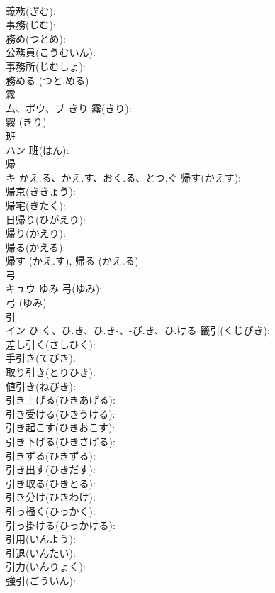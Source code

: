\documentclass[8pt]{extreport}
\begin{document}
\begin{CJK}{UTF8}{min}
\\	義務(ぎむ): 
\\	事務(じむ): 
\\	務め(つとめ): 
\\	公務員(こうむいん): 
\\	事務所(じむしょ): 
\\	務める (つと.める)
\\	霧			
\\	ム、ボウ、ブ	きり	霧(きり): 
\\	霧 (きり)
\\	班			
\\	ハン		班(はん): 
\\	帰			
\\	キ	かえ.る、かえ.す、おく.る、とつ.ぐ	帰す(かえす): 
\\	帰京(ききょう): 
\\	帰宅(きたく): 
\\	日帰り(ひがえり): 
\\	帰り(かえり): 
\\	帰る(かえる): 
\\	帰す (かえ.す), 帰る (かえ.る)
\\	弓			
\\	キュウ	ゆみ	弓(ゆみ): 
\\	弓 (ゆみ)
\\	引			
\\	イン	ひ.く、ひ.き、ひ.き-、-び.き、ひ.ける	籤引(くじびき): 
\\	差し引く(さしひく): 
\\	手引き(てびき): 
\\	取り引き(とりひき): 
\\	値引き(ねびき): 
\\	引き上げる(ひきあげる): 
\\	引き受ける(ひきうける): 
\\	引き起こす(ひきおこす): 
\\	引き下げる(ひきさげる): 
\\	引きずる(ひきずる): 
\\	引き出す(ひきだす): 
\\	引き取る(ひきとる): 
\\	引き分け(ひきわけ): 
\\	引っ掻く(ひっかく): 
\\	引っ掛ける(ひっかける): 
\\	引用(いんよう): 
\\	引退(いんたい): 
\\	引力(いんりょく): 
\\	強引(ごういん): 

\end{CJK}
\end{document}
